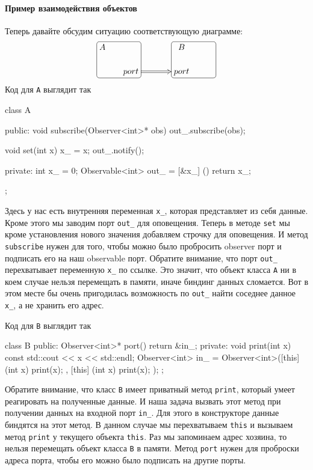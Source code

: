\paragraph{Пример взаимодействия объектов}

Теперь давайте обсудим ситуацию соответствующую диаграмме:
\[
\xymatrix@R=15pt@C=15pt{
	{A}
	{
	\save
   [].[rd]*[F-:<3pt>]\frm{}
   \restore
	}
	&{}&{}&{B}
	&{\phantom{C}}\\
	{}&{port}\ar@{=>}[rr]%
	&{}&{port}
	{
	\save
   [].[ru]*[F-:<3pt>]\frm{}
   \restore
	}	
	&{}\\
}
\]
Код для \verb"A" выглядит так
\begin{cppcode}
class A {
public:
  void subscribe(Observer<int>* obs) {
    out_.subscribe(obs);
  }
  
  void set(int x) {
    x_ = x;
    out_.notify();
  }
  
private:
  int x_ = 0;
  Observable<int> out_ = [&x_] () { return x_; }
};
\end{cppcode}
Здесь у нас есть внутренняя переменная \verb"x_", которая представляет из себя данные.
Кроме этого мы заводим порт \verb"out_" для оповещения.
Теперь в методе \verb"set" мы кроме установления нового значения добавляем строчку для оповещения.
И метод \verb"subscribe" нужен для того, чтобы можно было пробросить observer порт и подписать его на наш observable порт.
Обратите внимание, что порт \verb"out_" перехватывает переменную \verb"x_" по ссылке.
Это значит, что объект класса \verb"A" ни в коем случае нельзя перемещать в памяти, иначе биндинг данных сломается.
Вот в этом месте бы очень пригодилась возможность по \verb"out_" найти соседнее данное \verb"x_", а не хранить его адрес.

Код для \verb"B" выглядит так
\begin{cppcode}
class B {
public:
  Observer<int>* port() {
    return &in_;
  }
private:
  void print(int x) const {
    std::cout << x << std::endl;
  }
  Observer<int> in_ = Observer<int>([this] (int x) { print(x); },
                                    [this] (int x) { print(x); });
};
\end{cppcode}
Обратите внимание, что класс \verb"B" имеет приватный метод \verb"print", который умеет реагировать на полученные данные.
И наша задача вызвать этот метод при получении данных на входной порт \verb"in_".
Для этого в конструкторе данные биндятся на этот метод.
В данном случае мы перехватываем \verb"this" и вызываем метод \verb"print" у текущего объекта \verb"this".
Раз мы запоминаем адрес хозяина, то нельзя перемещать объект класса \verb"B" в памяти.
Метод \verb"port" нужен для проброски адреса порта, чтобы его можно было подписать на другие порты.

